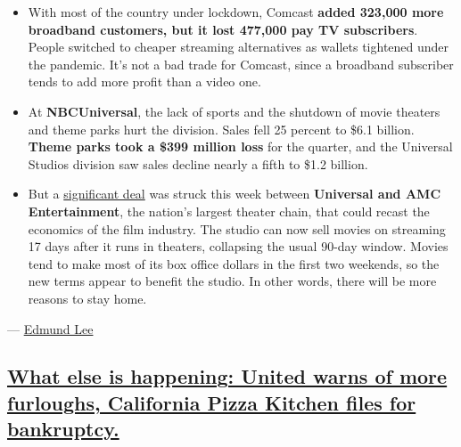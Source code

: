 \begin{itemize}
\tightlist
\item
  With most of the country under lockdown, Comcast \textbf{added 323,000
  more broadband customers, but it lost 477,000 pay TV subscribers}.
  People switched to cheaper streaming alternatives as wallets tightened
  under the pandemic. It's not a bad trade for Comcast, since a
  broadband subscriber tends to add more profit than a video one.
\end{itemize}

\begin{itemize}
\tightlist
\item
  At \textbf{NBCUniversal}, the lack of sports and the shutdown of movie
  theaters and theme parks hurt the division. Sales fell 25 percent to
  \$6.1 billion. \textbf{Theme parks took a \$399 million loss} for the
  quarter, and the Universal Studios division saw sales decline nearly a
  fifth to \$1.2 billion.
\end{itemize}

\begin{itemize}
\tightlist
\item
  But a
  \href{https://www.nytimes3xbfgragh.onion/2020/07/28/business/media/universal-amc-movies-at-home.html}{significant
  deal} was struck this week between \textbf{Universal and AMC
  Entertainment}, the nation's largest theater chain, that could recast
  the economics of the film industry. The studio can now sell movies on
  streaming 17 days after it runs in theaters, collapsing the usual
  90-day window. Movies tend to make most of its box office dollars in
  the first two weekends, so the new terms appear to benefit the studio.
  In other words, there will be more reasons to stay home.
\end{itemize}

--- \href{https://www.nytimes3xbfgragh.onion/by/edmund-lee}{Edmund Lee}

\hypertarget{what-else-is-happening-united-warns-of-more-furloughs-california-pizza-kitchen-files-for-bankruptcy}{%
\subsection{\texorpdfstring{\protect\hyperlink{what-else-is-happening-united-warns-of-more-furloughs-california-pizza-kitchen-files-for-bankruptcy}{What
else is happening: United warns of more furloughs, California Pizza
Kitchen files for
bankruptcy.}}{What else is happening: United warns of more furloughs, California Pizza Kitchen files for bankruptcy.}}\label{what-else-is-happening-united-warns-of-more-furloughs-california-pizza-kitchen-files-for-bankruptcy}}

